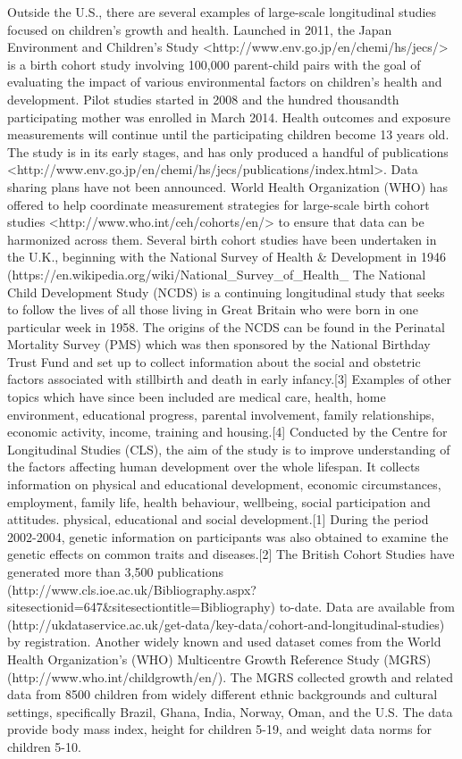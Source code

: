 \documentclass[letterpaper,man,apacite]{apa6}
\begin{document}
Outside the U.S., there are several examples of large-scale longitudinal studies focused on children's growth and health.
Launched in 2011, the Japan Environment and Children's Study <http://www.env.go.jp/en/chemi/hs/jecs/> is a birth cohort study involving 100,000 parent-child pairs with the goal of evaluating the impact of various environmental factors on children's health and development. 
Pilot studies started in 2008 and the hundred thousandth participating mother was enrolled in March 2014. 
Health outcomes and exposure measurements will continue until the participating children become 13 years old.
The study is in its early stages, and has only produced a handful of publications <http://www.env.go.jp/en/chemi/hs/jecs/publications/index.html>.
Data sharing plans have not been announced.
World Health Organization (WHO) has offered to help coordinate measurement strategies for large-scale birth cohort studies <http://www.who.int/ceh/cohorts/en/> to ensure that data can be harmonized across them.
Several birth cohort studies have been undertaken in the U.K., beginning with the National Survey of Health & Development in 1946 (https://en.wikipedia.org/wiki/National_Survey_of_Health_%
The National Child Development Study (NCDS) is a continuing longitudinal study that seeks to follow the lives of all those living in Great Britain who were born in one particular week in 1958. 
The origins of the NCDS can be found in the Perinatal Mortality Survey (PMS) which was then sponsored by the National Birthday Trust Fund and set up to collect information about the social and obstetric factors associated with stillbirth and death in early infancy.[3] Examples of other topics which have since been included are medical care, health, home environment, educational progress, parental involvement, family relationships, economic activity, income, training and housing.[4]
Conducted by the Centre for Longitudinal Studies (CLS), the aim of the study is to improve understanding of the factors affecting human development over the whole lifespan. 
It collects information on physical and educational development, economic circumstances, employment, family life, health behaviour, wellbeing, social participation and attitudes.
physical, educational and social development.[1] During the period 2002-2004, genetic information on participants was also obtained to examine the genetic effects on common traits and diseases.[2]
The British Cohort Studies have generated more than 3,500 publications (http://www.cls.ioe.ac.uk/Bibliography.aspx?sitesectionid=647&sitesectiontitle=Bibliography) to-date.
Data are available from (http://ukdataservice.ac.uk/get-data/key-data/cohort-and-longitudinal-studies) by registration.
Another widely known and used dataset comes from the World Health Organization's (WHO) Multicentre Growth Reference Study (MGRS) (http://www.who.int/childgrowth/en/).
The MGRS collected growth and related data from 8500 children from widely different ethnic backgrounds and cultural settings, specifically Brazil, Ghana, India, Norway, Oman, and the U.S.
The data provide body mass index, height for children 5-19, and weight data norms for children 5-10.
\end{document}
